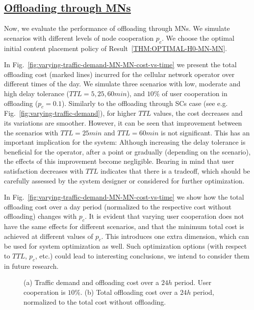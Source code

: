 \documentclass[10pt,conference,letterpaper]{IEEEtran}
\begin{document}
\subsection*{\underline{Offloading through MNs}} 
Now, we evaluate the performance of offloading through MNs. We simulate scenarios with different levels of node cooperation $p_{c}$. We choose the optimal initial content placement policy of Result~\ref{THM:OPTIMAL-H0-MN-MN}.


In Fig.~\ref{fig:varying-traffic-demand-MN-MN-cost-vs-time} we present the total offloading cost (marked lines) incurred for the cellular network operator over different times of the day. We simulate three scenarios with low, moderate and high delay tolerance ($TTL = 5,25,60min$), and $10\%$ of user cooperation in offloading ($p_{c}=0.1$). Similarly to the offloading through SCs case (see e.g. Fig.~\ref{fig:varying-traffic-demand}), for higher $TTL$ values, the cost decreases and its variations are smoother. However, it can be seen that improvement between the scenarios with $TTL=25min$ and $TTL=60min$ is not significant. This has an important implication for the system: Although increasing the delay tolerance is beneficial for the operator, after a point or gradually (depending on the scenario), the effects of this improvement become negligible. Bearing in mind that user satisfaction decreases with $TTL$ indicates that there is a tradeoff, which should be carefully assessed by the system designer or considered for further optimization.

In Fig.~\ref{fig:varying-traffic-demand-MN-MN-cost-vs-time} we show how the total offloading cost over a day period (normalized to the respective cost without offloading) changes with $p_{c}$. It is evident that varying user cooperation does not have the same effects for different scenarios, and that the minimum total cost is achieved at different values of $p_{c}$. This introduces one extra dimension, which can be used for system optimization as well. Such optimization options (with respect to $TTL$, $p_{c}$, etc.) could lead to interesting conclusions, we intend to consider them in future research.


\begin{figure}
\caption{(a) Traffic demand and offloading cost over a $24h$ period. User cooperation is $10\%$. (b) Total offloading cost over a $24h$ period, normalized to the total cost without offloading.}\label{fig:varying-traffic-demand-MN-MN}
\end{figure}
\end{document}
